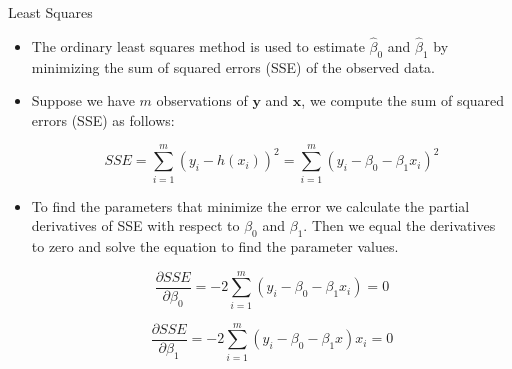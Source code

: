 \documentclass[handout]{beamer}
\begin{document}
\begin{frame}{Least Squares}
\scriptsize{
\begin{itemize}

 \item The ordinary least squares method is used to estimate  $\hat{\beta}_{0}$ and $\hat{\beta}_{1}$ by minimizing the sum of squared errors (SSE) of the observed data.

 \item Suppose we have $m$ observations of $\mathbf{y}$ and $\mathbf{x}$, we compute the sum of squared errors (SSE) as follows:

\begin{equation}
SSE = \sum_{i=1}^{m} (y_i-h(x_i))^2 =  \sum_{i=1}^{m} (y_i-\beta_{0}-\beta_{1}x_i)^2
\end{equation}

 \item To find the parameters that minimize the error we calculate the partial derivatives of SSE with respect to $\beta_{0}$ and $\beta_{1}$. Then we equal the derivatives to zero and solve the equation to find the parameter values.
 
 \begin{equation}
 \frac{\partial SSE}{ \partial \beta_0} = -2\sum_{i=1}^{m}(y_i-\beta_{0}-\beta_{1}x_i)=0
 \end{equation}

  \begin{equation}
 \frac{\partial SSE}{ \partial \beta_1} = -2\sum_{i=1}^{m}(y_i-\beta_{0}-\beta_{1}x)x_i=0
 \end{equation}



\end{itemize}



} 
\end{frame}
\end{document}
